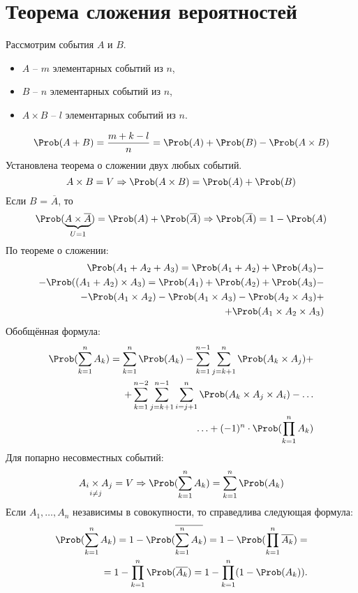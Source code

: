 \section{Теорема сложения вероятностей}
Рассмотрим события $A$ и $B$.
\begin{itemize}
  \item $A$ -- $m$ элементарных событий из $n$,
  \item $B$ -- $n$ элементарных событий из $n$,
  \item $A \times B$ -- $l$ элементарных событий из $n$.
\end{itemize}
\[
\Prob(A + B) = \frac{m + k - l}{n} = \Prob(A) + \Prob(B) - \Prob(A \times B)
\]
Установлена теорема о сложении двух любых событий.
\[
  A \times B = V \Rightarrow \Prob(A \times B) = \Prob(A) + \Prob(B)
\]
Если $B$ = $\overline{A}$, то
\[
  \Prob(\underbrace{A \times \overline{A}}_{U = 1}) = \Prob(A) + \Prob(\overline{A}) \Rightarrow \Prob(\overline{A}) = 1 - \Prob(A)
\]
По теореме о сложении:
\[
  \begin{split}
  \Prob(A_1 + A_2 + A_3) = \Prob(A_1 + A_2) + \Prob(A_3) - \\
  - \Prob((A_1 + A_2) \times A_3) = \Prob(A_1) + \Prob(A_2) + \Prob(A_3) - \\
  - \Prob(A_1 \times A_2) - \Prob(A_1 \times A_3) - \Prob(A_2 \times A_3) + \\
  + \Prob(A_1 \times A_2 \times A_3)
  \end{split}
\]
Обобщённая формула:
\[
  \begin{split}
    \Prob(\sum\limits_{k=1}^n A_k) = \sum\limits_{k=1}^n \Prob(A_k) - \sum\limits_{k=1}^{n-1} \sum\limits_{j=k+1}^n \Prob(A_k \times A_j) + \\
    + \sum\limits_{k=1}^{n-2} \sum\limits_{j=k+1}^{n-1} \sum\limits_{i=j+1}^n \Prob(A_k \times A_j \times A_i) - \ldots \\ \ldots + (-1)^n \cdot \Prob(\prod\limits_{k=1}^n A_k)
  \end{split}
\]
Для попарно несовместных событий:
\[
  \underset{i \not= j}{A_i \times A_j} = V \Rightarrow \Prob(\sum\limits_{k=1}^n A_k) = \sum\limits_{k=1}^n \Prob(A_k)
\]
Если $A_1, \dots, A_n$ независимы в совокупности, то справедлива следующая формула:
\[
\begin{split}
  \Prob(\sum\limits_{k=1}^n A_k) = 1 - \Prob(\overline{\sum\limits_{k=1}^n A_k}) = 1 - \Prob(\prod\limits_{k=1}^n \overline{A_k}) = \\
  = 1 - \prod\limits_{k=1}^n \Prob(\overline{A_k}) = 1 - \prod\limits_{k=1}^n(1 - \Prob(A_k)).
\end{split}
\]
